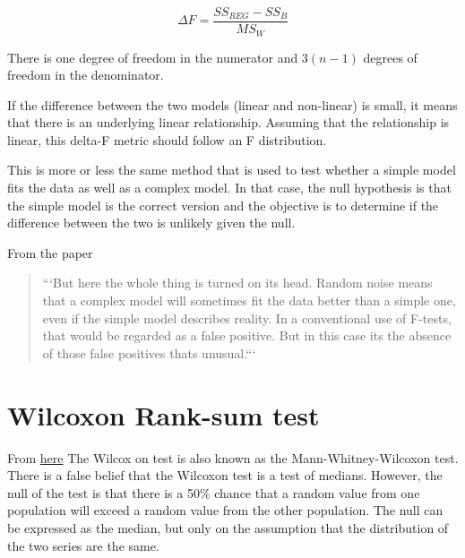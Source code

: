 \documentclass[12pt, a4paper, oneside]{article}\usepackage{graphicx, color}
\begin{document}
\begin{equation}
\Delta F = \frac{SS_{REG} - SS_B}{MS_W}
\end{equation}

There is one degree of freedom in the numerator and $3(n-1)$ degrees of freedom in the denominator. 

If the difference between the two models (linear and non-linear) is small, it means that there is an underlying linear relationship. Assuming that the relationship is linear, this delta-F metric should follow an F distribution. 

This is more or less the same method that is used to test whether a simple model fits the data as well as a complex model. In that case, the null hypothesis is that the simple model is the correct version and the objective is to determine if the difference between the two is unlikely given the null. 

From the paper

\begin{quotation}
```But here the whole thing is turned on its head. Random noise means that a complex model will sometimes fit the data better than a simple one, even if the simple model describes reality. In a conventional use of F-tests, that would be regarded as a false positive. But in this case its the absence of those false positives thats unusual.```
\end{quotation}

\section{Wilcoxon Rank-sum test}
From \href{http://www.r-bloggers.com/example-2014-6-comparing-medians-and-the-wilcoxon-rank-sum-test/}{here}
The Wilcox on test is also known as the Mann-Whitney-Wilcoxon test. There is a false belief that the Wilcoxon test is a test of medians.  However, the null of the test is that there is a 50\% chance that a random value from one population will exceed a random value from the other population. The null can be expressed as the median, but only on the assumption that the distribution of the two series are the same. 
\end{document}
